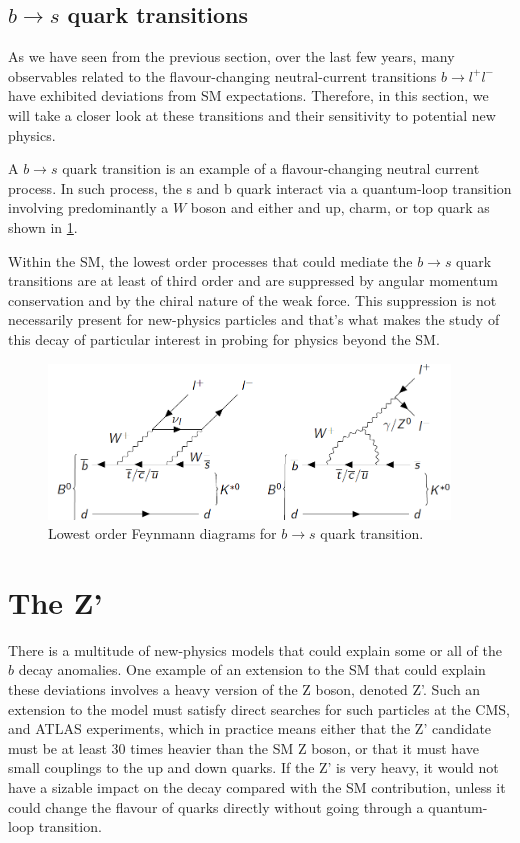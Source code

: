 \subsection{$b\rightarrow s$ quark transitions}
As we have seen from the previous section, over the last few years, many observables related to the flavour-changing neutral-current transitions $b\rightarrow l^{+}l^{-}$ have exhibited deviations from SM expectations. Therefore, in this section, we will take a closer look at these transitions and their sensitivity to potential new physics.

A $b\rightarrow s$ quark transition is an example of a flavour-changing neutral current process\cite{NatFCNC}. In such process, the s and b quark interact via a quantum-loop transition involving predominantly a $W$ boson and either and up, charm, or top quark as shown in \ref{fig:bmesonpic}.

Within the SM, the lowest order processes that could mediate the $b\rightarrow s$ quark transitions are at least of third order and are suppressed by angular momentum conservation and by the chiral nature of the weak force. This suppression is not necessarily present for new-physics particles and that's what makes the study of this decay of particular interest in probing for physics beyond the SM.

 \begin{figure}[H]
 	\centering
 	\includegraphics[width=0.95\textwidth]{figures/bmeson.png}
 	\singlespace
 	\caption{Lowest order Feynmann diagrams for $b\rightarrow s$ quark transition.}
 	\label{fig:bmesonpic}
 \end{figure}

\section{The Z'}
There is a multitude of new-physics models that could explain some or all of the $b$ decay anomalies. One example of an extension to the SM that could explain these deviations involves a heavy version of the Z boson, denoted Z'\cite{Buras:2013}. Such an extension to the model must satisfy direct searches for such particles at the CMS\cite{201757}, \cite{Sirunyan:2018exx} and ATLAS \cite{ATLAS-CONF-2016-045} experiments, which in practice means either that the Z' candidate must be at least 30 times heavier than the SM Z boson, or that it must have small couplings to the up and down quarks. If the Z' is very heavy, it would not have a sizable impact on the decay compared with the SM contribution, unless it could change the flavour of quarks directly without going through a quantum-loop transition.

